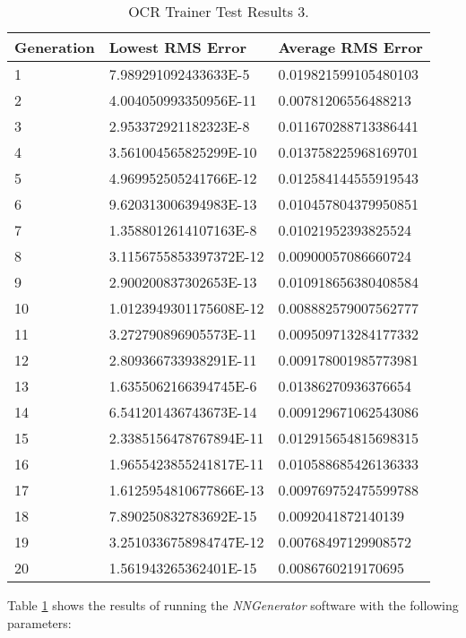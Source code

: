 \begin{center}
    \begin{longtable}{ | l | l | l |}
      \caption{OCR Trainer Test Results 3.} \label{ocr3} \\
    \hline
  Generation & Lowest RMS Error & Average RMS Error \\ \hline
1 &	7.989291092433633E-5 &	0.019821599105480103 \\ \hline
2 &	4.004050993350956E-11 &	0.00781206556488213 \\ \hline
3 &	2.953372921182323E-8 &	0.011670288713386441 \\ \hline
4 &	3.561004565825299E-10 &	0.013758225968169701 \\ \hline
5 &	4.969952505241766E-12 &	0.012584144555919543 \\ \hline
6 &	9.620313006394983E-13 &	0.010457804379950851 \\ \hline
7 &	1.3588012614107163E-8 &	0.01021952393825524 \\ \hline
8 &	3.1156755853397372E-12 &	0.00900057086660724 \\ \hline
9 &	2.900200837302653E-13 &	0.010918656380408584 \\ \hline
10 &	1.0123949301175608E-12 &	0.008882579007562777 \\ \hline
11 &	3.272790896905573E-11 &	0.009509713284177332 \\ \hline
12 &	2.809366733938291E-11 &	0.009178001985773981 \\ \hline
13 &	1.6355062166394745E-6 &	0.01386270936376654 \\ \hline
14 &	6.541201436743673E-14 &	0.009129671062543086 \\ \hline
15 &	2.3385156478767894E-11 &	0.012915654815698315 \\ \hline
16 &	1.9655423855241817E-11 &	0.010588685426136333 \\ \hline
17 &	1.6125954810677866E-13 &	0.009769752475599788 \\ \hline
18 &	7.890250832783692E-15 &	0.0092041872140139 \\ \hline
19 &	3.2510336758984747E-12 &	0.00768497129908572 \\ \hline
20 &	1.561943265362401E-15 &	0.0086760219170695 \\ \hline
\end{longtable}
\end{center}

Table \ref{ocr3} shows the results of running the {\it NNGenerator} software with the following parameters:

